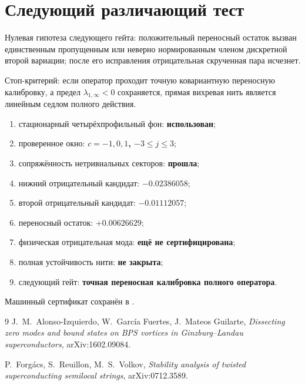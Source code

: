 \section{Следующий различающий тест}

Нулевая гипотеза следующего гейта: положительный переносный остаток вызван
единственным пропущенным или неверно нормированным членом дискретной второй
вариации; после его исправления отрицательная скрученная пара исчезнет.

Стоп-критерий: если оператор проходит точную ковариантную переносную
калибровку, а предел $\lambda_{1,\infty}<0$ сохраняется, прямая вихревая
нить является линейным седлом полного действия.

\begin{protocol}
\begin{enumerate}
 \item стационарный четырёхпрофильный фон: \textbf{использован};
 \item проверенное окно: \textbf{$c=-1,0,1$, $-3\le j\le3$};
 \item сопряжённость нетривиальных секторов: \textbf{прошла};
 \item нижний отрицательный кандидат: \textbf{$-0.02386058$};
 \item второй отрицательный кандидат: \textbf{$-0.01112057$};
 \item переносный остаток: \textbf{$+0.00626629$};
 \item физическая отрицательная мода: \textbf{ещё не сертифицирована};
 \item полная устойчивость нити: \textbf{не закрыта};
 \item следующий гейт: \textbf{точная переносная калибровка полного оператора}.
\end{enumerate}
\end{protocol}

Машинный сертификат сохранён в
.

\begin{thebibliography}{9}
J.~M.~Alonso-Izquierdo, W.~Garc\'ia Fuertes, J.~Mateos Guilarte,
\emph{Dissecting zero modes and bound states on BPS vortices in
Ginzburg--Landau superconductors}, arXiv:1602.09084.

P.~Forg\'acs, S.~Reuillon, M.~S.~Volkov,
\emph{Stability analysis of twisted superconducting semilocal strings},
arXiv:0712.3589.
\end{thebibliography}